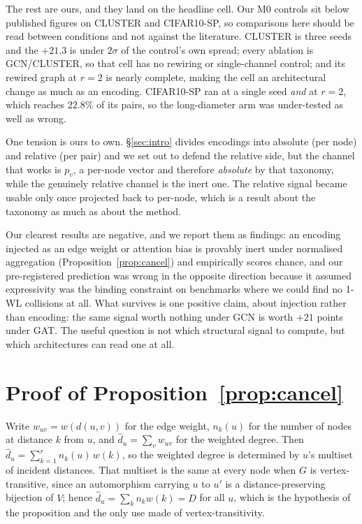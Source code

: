 \documentclass[11pt]{article}
\begin{document}
The rest are ours, and they land on the headline cell. Our M0 controls sit below published
figures on CLUSTER and CIFAR10-SP, so comparisons here should be read between conditions and not
against the literature. CLUSTER is three seeds and the $+21.3$ is under $2\sigma$ of the
control's own spread; every ablation is GCN/CLUSTER, so that cell has no rewiring or
single-channel control; and its rewired graph at $r=2$ is nearly complete, making the cell an
architectural change as much as an encoding. CIFAR10-SP ran at a single seed \emph{and} at $r=2$,
which reaches $22.8\%$ of its pairs, so the long-diameter arm was under-tested as well as wrong.

One tension is ours to own. \S\ref{sec:intro} divides encodings into absolute (per node) and
relative (per pair) and we set out to defend the relative side, but the channel that works is
$p_v$, a per-node vector and therefore \emph{absolute} by that taxonomy, while the genuinely
relative channel is the inert one. The relative signal became usable only once projected back to
per-node, which is a result about the taxonomy as much as about the method.

Our clearest results are negative, and we report them as findings: an encoding injected as an
edge weight or attention bias is provably inert under normalised aggregation
(Proposition~\ref{prop:cancel}) and empirically scores chance, and our pre-registered prediction
was wrong in the opposite direction because it assumed expressivity was the binding constraint on
benchmarks where we could find no 1-WL collisions at all. What survives is one positive claim,
about injection rather than encoding: the same signal worth nothing under GCN is worth $+21$
points under GAT. The useful question is not which structural signal to compute, but which
architectures can read one at all.



\appendix

\section{Proof of Proposition~\ref{prop:cancel}}
\label{app:proof}
Write $w_{uv}=w(d(u,v))$ for the edge weight, $n_k(u)$ for the number of nodes at distance $k$
from $u$, and $\hat d_u=\sum_v w_{uv}$ for the weighted degree. Then
$\hat d_u=\sum_{k=1}^{r} n_k(u)\,w(k)$, so the weighted degree is determined by $u$'s multiset of
incident distances. That multiset is the same at every node when $G$ is vertex-transitive, since
an automorphism carrying $u$ to $u'$ is a distance-preserving bijection of $V$; hence
$\hat d_u=\sum_k n_k w(k)=D$ for all $u$, which is the hypothesis of the proposition and the only
use made of vertex-transitivity.
\end{document}
